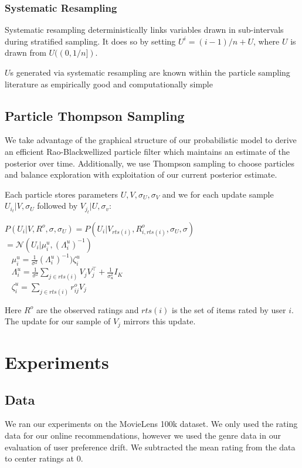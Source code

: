 \documentclass{article}
\begin{document}
\subsubsection{Systematic Resampling}
Systematic resampling deterministically links variables drawn in sub-intervals during stratified sampling. It does so by setting $U^i = (i-1)/n + U$, where $U$ is drawn from $U((0, 1/n])$.

$U$s generated via systematic resampling are known within the particle sampling literature as empirically good and computationally simple \cite{douc2005comparison}

\subsection{Particle Thompson Sampling}
We take advantage of the graphical structure of our probabilistic model to derive an efficient Rao-Blackwellized particle filter which maintains an estimate of the posterior over time. Additionally, we use Thompson sampling to choose particles and balance exploration with exploitation of our current posterior estimate.

Each particle stores parameters $U, V, \sigma_U, \sigma_V$ and we for each update sample $U_{i_t}|V, \sigma_U$
followed by $V_{j_t}|U, \sigma_v$:
\begin{center}
$P(U_i | V, R^o, \sigma, \sigma_U) = P(U_i | V_{rts(i)}, R^o_{i, rts(i)}, \sigma_U, \sigma)$ \\
$= \mathcal{N}(U_i | \mu^u_i, (\Lambda_i^u)^{-1})$ \\
\ \newline
{} $\mu_i^u = \frac{1}{\sigma^2}(\Lambda_i^u)^{-1})\zeta_i^u$ \\
\ \newline
$\Lambda_i^u = \frac{1}{\sigma^2} \sum_{j \in rts(i)} V_j V_j^{\top} + \frac{1}{\sigma_u^2}I_K$ \\
\ \newline
$\zeta_i^u = \sum_{j \in rts(i)} r_{ij}^o V_j$
\end{center}


Here $R^o$ are the observed ratings and $rts(i)$ is the set of items rated by user $i$. The update for our sample of $V_j$ mirrors this update.


\section{Experiments}

\subsection{Data}
We ran our experiments on the MovieLens 100k dataset. We only used the rating data for our
online recommendations, however we used the genre data in our evaluation of user preference
drift. We subtracted the mean rating from the data to center ratings at 0.
\end{document}
